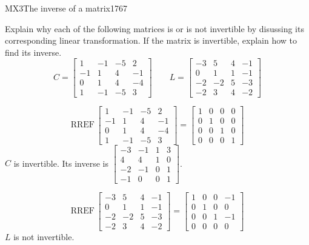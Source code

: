 \begin{exercise}{MX3}{The inverse of a matrix}{1767} 
\begin{exerciseStatement} 

 Explain why each of the following matrices is or is not invertible by disussing its corresponding linear transformation. If the matrix is invertible, explain how to find its inverse. \[
\hspace{2em}
C = \left[\begin{array}{cccc}
1 & -1 & -5 & 2 \\
-1 & 1 & 4 & -1 \\
0 & 1 & 4 & -4 \\
1 & -1 & -5 & 3
\end{array}\right]
\hspace{2em}
L = \left[\begin{array}{cccc}
-3 & 5 & 4 & -1 \\
0 & 1 & 1 & -1 \\
-2 & -2 & 5 & -3 \\
-2 & 3 & 4 & -2
\end{array}\right]
\hspace{2em}
        \] 

 \end{exerciseStatement}
 \begin{exerciseAnswer} 

 \[\mathrm{RREF}\,\left[\begin{array}{cccc}
1 & -1 & -5 & 2 \\
-1 & 1 & 4 & -1 \\
0 & 1 & 4 & -4 \\
1 & -1 & -5 & 3
\end{array}\right]=\left[\begin{array}{cccc}
1 & 0 & 0 & 0 \\
0 & 1 & 0 & 0 \\
0 & 0 & 1 & 0 \\
0 & 0 & 0 & 1
\end{array}\right]\] \(C\) is invertible. Its inverse is \(\left[\begin{array}{cccc}
-3 & -1 & 1 & 3 \\
4 & 4 & 1 & 0 \\
-2 & -1 & 0 & 1 \\
-1 & 0 & 0 & 1
\end{array}\right]\). 

 

 \[\mathrm{RREF}\,\left[\begin{array}{cccc}
-3 & 5 & 4 & -1 \\
0 & 1 & 1 & -1 \\
-2 & -2 & 5 & -3 \\
-2 & 3 & 4 & -2
\end{array}\right]=\left[\begin{array}{cccc}
1 & 0 & 0 & -1 \\
0 & 1 & 0 & 0 \\
0 & 0 & 1 & -1 \\
0 & 0 & 0 & 0
\end{array}\right]\] \(L\) is not invertible. 

 \end{exerciseAnswer}
 \end{exercise}


